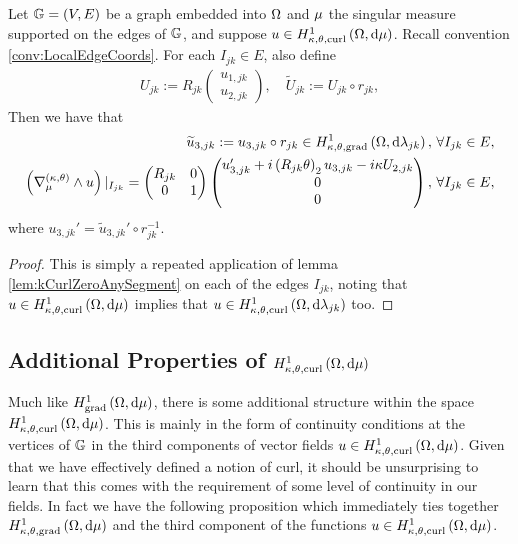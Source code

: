 \begin{theorem} \label{thm:ktTanCurlsGraphs}
	Let $\mathbb{G}=\left( V,E \right)$ be a graph embedded into $\Omega$ and $\mu$ the singular measure supported on the edges of $\mathbb{G}$, and suppose $u\in H^1_{\kappa,\theta,\mathrm{curl}}\left( \Omega, \mathrm{d}\mu \right)$.
	Recall convention \ref{conv:LocalEdgeCoords}.
	For each $I_{jk}\in E$, also define
	\begin{align*}
		U_{jk} := R_{jk}\begin{pmatrix} u_{1,jk} \\ u_{2,jk} \end{pmatrix}, \quad
		\widetilde{U}_{jk} := U_{jk} \circ r_{jk},
	\end{align*}
	Then we have that 
	\begin{align*}
		\widetilde{u}_{3,jk} := u_{3,jk}\circ r_{jk}\in H^1_{\kappa,\theta,\mathrm{grad}}\left( \Omega, \mathrm{d}\lambda_{jk} \right), &\ \forall I_{jk}\in E, \\
		\left( \nabla_{\mu}^{\left( \kappa, \theta \right)}\wedge u \right)\vert_{I_{jk}} = \begin{pmatrix} R_{jk} & 0 \\ 0 & 1 \end{pmatrix} \begin{pmatrix} u_{3,jk}' + i\left( R_{jk}\theta \right)_2 u_{3,jk} - i\kappa U_{2,jk} \\ 0 \\ 0 \end{pmatrix}, 
		&\ \forall I_{jk}\in E,
	\end{align*}
	where $u_{3,jk}' = \widetilde{u}_{3,jk}' \circ r_{jk}^{-1}$.
\end{theorem}
\begin{proof}
	This is simply a repeated application of lemma \ref{lem:kCurlZeroAnySegment} on each of the edges $I_{jk}$, noting that $u\in H^1_{\kappa,\theta,\mathrm{curl}}\left( \Omega, \mathrm{d}\mu \right)$ implies that $u\in H^1_{\kappa,\theta,\mathrm{curl}}\left( \Omega, \mathrm{d}\lambda_{jk} \right)$ too.
\end{proof}

\subsection{Additional Properties of $H^1_{\kappa,\theta,\mathrm{curl}}\left( \Omega, \mathrm{d}\mu \right)$} \label{sec:ktcurlSobExtraProperties}
Much like $H^1_\mathrm{grad}\left( \Omega, \mathrm{d}\mu \right)$, there is some additional structure within the space $H^1_{\kappa,\theta,\mathrm{curl}}\left( \Omega, \mathrm{d}\mu \right)$.
This is mainly in the form of continuity conditions at the vertices of $\mathbb{G}$ in the third components of vector fields $u\in H^1_{\kappa,\theta,\mathrm{curl}}\left( \Omega, \mathrm{d}\mu \right)$.
Given that we have effectively defined a notion of curl, it should be unsurprising to learn that this comes with the requirement of some level of continuity in our fields.
In fact we have the following proposition which immediately ties together $H^1_{\kappa,\theta,\mathrm{grad}}\left( \Omega, \mathrm{d}\mu \right)$ and the third component of the functions $u\in H^1_{\kappa,\theta,\mathrm{curl}}\left( \Omega, \mathrm{d}\mu \right)$.

